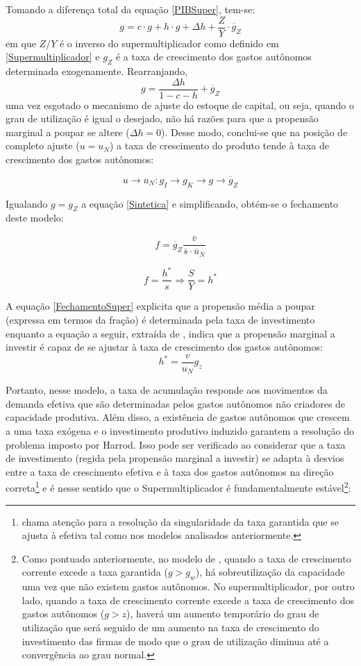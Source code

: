 Tomando a diferença total da equação \ref{PIBSuper}, tem-se:
$$
g = c\cdot g + h\cdot g + \Delta h + \frac{Z}{Y}\cdot \overline g_Z
$$
em que $Z/Y$ é o inverso do supermultiplicador como definido em \ref{Supermultiplicador} e $g_Z$ é a taxa de crescimento dos gastos autônomos determinada exogenamente. Rearranjando, 
\begin{equation}
\label{crescimentosuper}
g = \frac{\Delta h}{1 - c - h} + \overline g_Z
\end{equation}
uma vez esgotado o mecanismo de ajuste do estoque de capital, ou seja, quando o grau de utilização é igual o desejado, não há razões para que a propensão marginal a poupar se altere ($\Delta h = 0$). Desse modo, conclui-se que na posição de completo ajuste ($u = u_N$) a taxa de crescimento do produto tende à taxa de crescimento dos gastos autônomos:

$$
u \to u_N : g_I \to g_K \to g \to \overline g_Z
$$

Igualando $g = g_Z$ a equação \ref{Sintetica} e simplificando, obtém-se o fechamento deste modelo:

$$
    f = \overline g_Z\frac{\overline v}{\overline s\cdot \overline u_N}
$$

\begin{equation}
    \label{FechamentoSuper}
	f = \frac{h^*}{s} \Rightarrow \frac{S}{Y} = h^*
\end{equation}

A equação \ref{FechamentoSuper} explicita que a propensão média a poupar (expressa em termos da fração) é determinada pela taxa de investimento enquanto a equação a seguir, extraída de \textcite{serrano_sraffian_2017}, indica que a propensão marginal a investir é capaz de se ajustar à taxa de crescimento dos gastos autônomos:
$$
h^* = \frac{v}{u_N}g_z
$$

Portanto, nesse modelo, a taxa de acumulação responde aos movimentos da demanda efetiva que são determinadas pelos gastos autônomos não criadores de capacidade produtiva. Além disso, a existência de gastos autônomos que crescem a uma taxa exógena e o investimento produtivo induzido garantem a resolução do problema imposto por Harrod. Isso pode ser verificado ao considerar que a taxa de investimento (regida pela propensão marginal a investir) se adapta à desvios entre a taxa de crescimento efetiva e à taxa dos gastos autônomos na direção correta\footnote{\textcite{cesaratto_neo-kaleckian_2015} chama atenção para a resolução da singularidade da taxa garantida que se ajusta à efetiva tal como nos modelos analisados anteriormente.} e é nesse sentido que o Supermultiplicador é fundamentalmente estável\footnote{
Como pontuado anteriormente, no modelo de \textcite{harrod_essay_1939}, quando a taxa de crescimento corrente excede a taxa garantida ($g > g_w$), há sobreutilização da capacidade uma vez que não existem gastos autônomos. No supermultiplicador, por outro lado, quando a taxa de crescimento corrente excede a taxa de crescimento dos gastos autônomos ($g > z$), haverá  um aumento temporário do grau de utilização que será seguido de um aumento na taxa de crescimento do investimento das firmas de modo que o grau de utilização diminua até a convergência ao grau normal.}:

